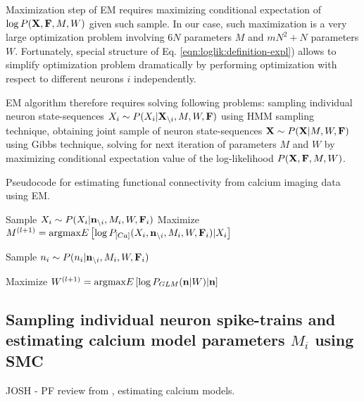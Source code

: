 Maximization step of EM requires maximizing conditional expectation of $\log P({\bf X}, {\bf F}, M, W)$ given such sample. In our case, such maximization is a very large optimization problem involving $6N$ parameters $M$ and $mN^2+N$ parameters $W$. Fortunately, special structure of Eq. \eqref{eqn:loglik:definition-expl}) allows to simplify optimization problem dramatically by performing optimization with respect to different neurons $i$ independently.

EM algorithm therefore requires solving following problems: sampling individual neuron state-sequences $X_i\sim P(X_{i}|{\bf X}_{\backslash i}, M, W, {\bf F})$ using HMM sampling technique, obtaining joint sample of neuron state-sequences ${\bf X}\sim P({\bf X}|M, W, {\bf F})$ using Gibbs technique, solving for next iteration of parameters $M$ and $W$ by maximizing conditional expectation value of the log-likelihood $P({\bf X}, {\bf F}, M, W)$.

\begin{algorithm}
\caption{Pseudocode for estimating functional connectivity from calcium imaging data using EM.}\label{eqn:pseudocode}
\begin{algorithmic}
      \State Sample $X_i \sim P(X_i|{\bf n}_{\backslash i}, M_i, W, {\bf F}_i)$
      \State Maximize $M^{(l+1)}=\text{argmax} E\left[\log P_{[Ca]}(X_i, {\bf n}_{\backslash i}, M_i, W, {\bf F}_i)|X_i\right]$
    \EndWhile
  \EndFor
  
      \State Sample $n_i \sim P(n_i|{\bf n}_{\backslash i}, M_i, W, {\bf F}_i)$
    \EndFor
  \EndFor 

  \State Maximize $W^{(l+1)}=\text{argmax} E\left[\log P_{GLM}({\bf n}|W)|{\bf n}\right]$  
\EndWhile
\end{algorithmic}
\end{algorithm}

\subsection{\label{sec:methods:sampling_neuron}Sampling individual neuron spike-trains and estimating calcium model parameters $M_i$ using SMC}
JOSH - PF review from \cite{Vogelstein2009}, estimating calcium models.

